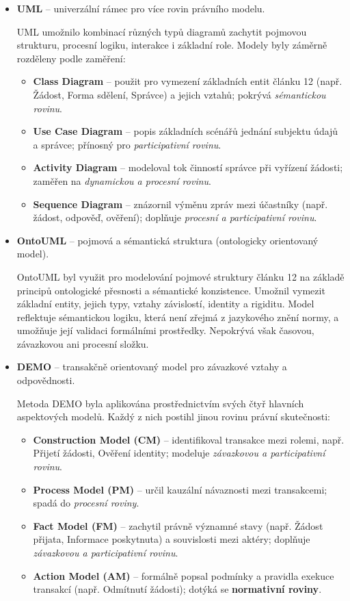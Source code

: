 \begin{itemize}
  \item \textbf{UML} – univerzální rámec pro více rovin právního modelu.

  UML umožnilo kombinací různých typů diagramů zachytit pojmovou strukturu, procesní logiku, interakce i základní role. Modely byly záměrně rozděleny podle zaměření:

  \begin{itemize}
    \item \textbf{Class Diagram} – použit pro vymezení základních entit článku 12 (např. Žádost, Forma sdělení, Správce) a jejich vztahů; pokrývá \textit{sémantickou rovinu}.
    \item \textbf{Use Case Diagram} – popis základních scénářů jednání subjektu údajů a správce; přínosný pro \textit{participativní rovinu}.
    \item \textbf{Activity Diagram} – modeloval tok činností správce při vyřízení žádosti; zaměřen na \textit{dynamickou a procesní rovinu}.
    \item \textbf{Sequence Diagram} – znázornil výměnu zpráv mezi účastníky (např. žádost, odpověď, ověření); doplňuje \textit{procesní a participativní rovinu}.
  \end{itemize}

  \item \textbf{OntoUML} – pojmová a sémantická struktura (ontologicky orientovaný model).

  OntoUML byl využit pro modelování pojmové struktury článku 12 na základě principů ontologické přesnosti a sémantické konzistence. Umožnil vymezit základní entity, jejich typy, vztahy závislostí, identity a rigiditu. Model reflektuje sémantickou logiku, která není zřejmá z jazykového znění normy, a umožňuje její validaci formálními prostředky. Nepokrývá však časovou, závazkovou ani procesní složku.

  \item \textbf{DEMO} – transakčně orientovaný model pro závazkové vztahy a odpovědnosti.

  Metoda DEMO byla aplikována prostřednictvím svých čtyř hlavních aspektových modelů. Každý z nich postihl jinou rovinu právní skutečnosti:

  \begin{itemize}
    \item \textbf{Construction Model (CM)} – identifikoval transakce mezi rolemi, např. Přijetí žádosti, Ověření identity; modeluje \textit{závazkovou a participativní rovinu}.
    \item \textbf{Process Model (PM)} – určil kauzální návaznosti mezi transakcemi; spadá do \textit{procesní roviny}.
    \item \textbf{Fact Model (FM)} – zachytil právně významné stavy (např. Žádost přijata, Informace poskytnuta) a souvislosti mezi aktéry; doplňuje \textit{závazkovou a participativní rovinu}.
    \item \textbf{Action Model (AM)} – formálně popsal podmínky a pravidla exekuce transakcí (např. Odmítnutí žádosti); dotýká se \textbf{normativní roviny}.
  \end{itemize}


\end{itemize}
